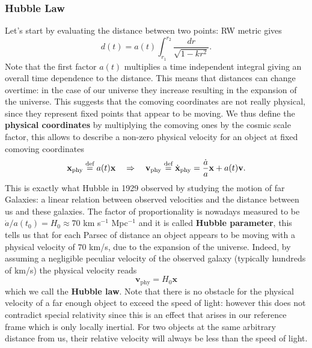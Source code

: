 \subsubsection{Hubble Law}
Let's start by evaluating the distance between two points: RW metric gives 
$$d(t)=a(t)\int_{r_1}^{r_2}\frac{dr}{\sqrt{1-kr^2}}.$$
Note that the first factor $a(t)$ multiplies a time independent integral giving an overall time dependence to the distance. This means that distances can change overtime: in the case of our universe they increase resulting in the expansion of the universe. This suggests that the comoving coordinates are not really physical, since they represent fixed points that appear to be moving. We thus define the \textbf{physical coordinates} by multiplying the comoving ones by the cosmic scale factor, this allows to describe a non-zero physical velocity for an object at fixed comoving coordinates
$$\mathbf{x}_\text{phy}\stackrel{\text{def}}{=} a(t)\mathbf{x} \quad\Rightarrow\quad \mathbf{v}_\text{phy}\stackrel{\text{def}}{=}\dot{\mathbf{x}}_\text{phy}=\frac{\dot a}{a} \mathbf{x}+a(t)\mathbf{v}.$$
This is exactly what Hubble in 1929 observed by studying the motion of far Galaxies: a linear relation between observed velocities and the distance between us and these galaxies. The factor of proportionality is nowadays measured to be $\dot a/a(t_0)=H_0\approx70$ km s$^{-1}$ Mpc$^{-1}$ and it is called \textbf{Hubble parameter}, this tells us that for each Parsec of distance an object appears to be moving with a physical velocity of $70$ km/s, due to the expansion of the universe. Indeed, by assuming a negligible peculiar velocity of the observed galaxy (typically hundreds of km/s) the physical velocity reads
\begin{equation}
    \label{eq:Hubble_Law}
    \mathbf{v}_\text{phy}=H_0\mathbf{x}
\end{equation}
which we call the \textbf{Hubble law}. Note that there is no obstacle for the physical velocity of a far enough object to exceed the speed of light: however this does not contradict special relativity since this is an effect that arises in our reference frame which is only locally inertial. For two objects at the same arbitrary distance from us, their relative velocity will always be less than the speed of light.
